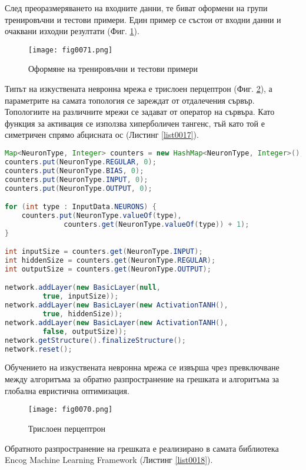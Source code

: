 След преоразмеряването на входните данни, те биват оформени на групи тренировъчни и тестови примери. Един пример се състои от входни данни и очаквани изходни резултати (Фиг. \ref{fig0071}).

\begin{figure}[H]
  \centering
  \texttt{[image: fig0071.png]}
  \caption{Оформяне на тренировъчни и тестови примери}
\label{fig0071}
\end{figure}

Типът на изкуствената невронна мрежа е трислоен перцептрон (Фиг. \ref{fig0070}), а параметрите на самата топология се зареждат от отдалечения сървър. Топологиите на различните мрежи се задават от оператор на сървъра. Като функция за активация се използва хиперболичен тангенс, тъй като той е симетричен спрямо абцисната ос (Листинг \ref{list0017}).

\begin{lstlisting}[caption=Конструиране на изкуствена невронна мрежа, language=Java, basicstyle=\tiny, label=list0017]
Map<NeuronType, Integer> counters = new HashMap<NeuronType, Integer>();
counters.put(NeuronType.REGULAR, 0);
counters.put(NeuronType.BIAS, 0);
counters.put(NeuronType.INPUT, 0);
counters.put(NeuronType.OUTPUT, 0);

for (int type : InputData.NEURONS) {
	counters.put(NeuronType.valueOf(type),
			  counters.get(NeuronType.valueOf(type)) + 1);
}

int inputSize = counters.get(NeuronType.INPUT);
int hiddenSize = counters.get(NeuronType.REGULAR);
int outputSize = counters.get(NeuronType.OUTPUT);

network.addLayer(new BasicLayer(null,
		 true, inputSize));
network.addLayer(new BasicLayer(new ActivationTANH(),
		 true, hiddenSize));
network.addLayer(new BasicLayer(new ActivationTANH(),
		 false, outputSize));
network.getStructure().finalizeStructure();
network.reset();
\end{lstlisting}

Обучението на изкуствената невронна мрежа се извърша чрез превключване между алгоритъма за обратно разпространение на грешката и алгоритъма за глобална евристична оптимизация. 

\begin{figure}[H]
  \centering
  \texttt{[image: fig0070.png]}
  \caption{Трислоен перцептрон}
\label{fig0070}
\end{figure}

Обратното разпространение на грешката е реализирано в самата библиотека Encog Machine Learning Framework (Листинг \ref{list0018}).

